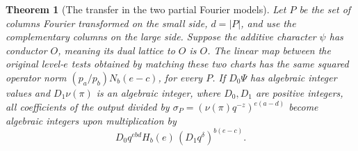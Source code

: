 \documentclass[a4paper,11pt]{article}
\newtheorem{theorem}[proposition]{Theorem}
\theoremstyle{definition}
\theoremstyle{remark}
\numberwithin{equation}{section}
\begin{document}
\begin{theorem}[The transfer in the two partial Fourier models]\label{thm:mixedfourier334}
Let \(P\) be the set of columns Fourier transformed on the small side,
\(d=|P|\), and use the complementary columns on the large side. Suppose
the additive character \(\psi\) has conductor \(O\), meaning its dual
lattice to \(O\) is \(O\). The linear map between the original level-\(e\)
tests obtained by matching these two charts has the same squared operator
norm \((p_a/p_b)N_b(e-c)\), for every \(P\). If \(D_0\Psi\) has algebraic
integer values and \(D_1\nu(\pi)\) is an algebraic integer, where \(D_0,D_1\)
are positive integers, all coefficients of the output divided by
\(\sigma_P=(\nu(\pi)q^{-z})^{e(a-d)}\) become algebraic integers upon
multiplication by
\[
         D_0 q^{ebd} H_b(e)\,(D_1 q^\delta)^{b(e-c)} .
\]
\end{theorem}
\end{document}
